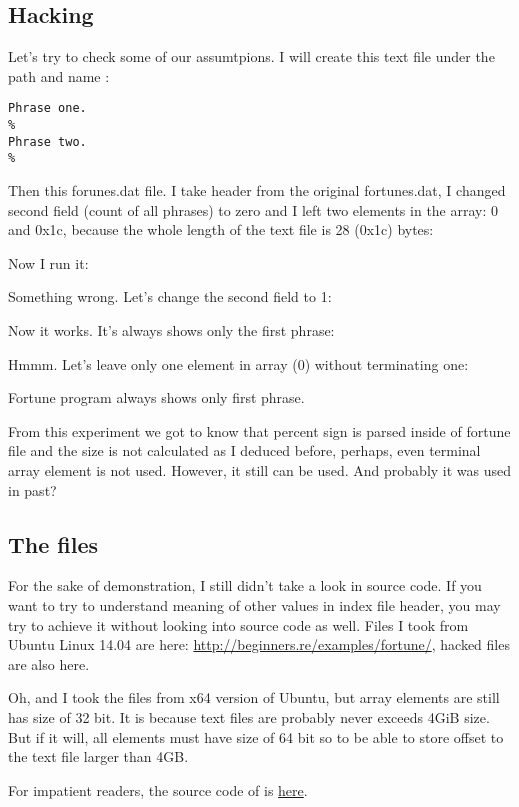 \subsection{Hacking}

Let's try to check some of our assumtpions.
I will create this text file under the path and name :

\begin{lstlisting}
Phrase one.
%
Phrase two.
%
\end{lstlisting}

Then this forunes.dat file. I take header from the original fortunes.dat, I changed second field (count of all phrases) to zero and I left two
elements in the array: 0 and 0x1c, because the whole length of the text  file is 28 (0x1c) bytes:



Now I run it:



Something wrong. Let's change the second field to 1:



Now it works. It's always shows only the first phrase:



Hmmm. Let's leave only one element in array (0) without terminating one:



Fortune program always shows only first phrase.

From this experiment we got to know that percent sign is parsed inside of fortune file and the size is not calculated as
I deduced before, perhaps, even terminal array element is not used.
However, it still can be used. And probably it was used in past?


\subsection{The files}

For the sake of demonstration, I still didn't take a look in  source code.
If you want to try to understand meaning of other values in index file header, you may try to achieve it without looking into source code as well.
Files I took from Ubuntu Linux 14.04 are here: \url{http://beginners.re/examples/fortune/}, hacked files are also here.

Oh, and I took the files from x64 version of Ubuntu, but array elements are still has size of 32 bit.
It is because  text files are probably never exceeds 4\ac{GiB} size.
But if it will, all elements must have size of 64 bit so to be able to store offset to the text file larger than 4GB.

For impatient readers, the source code of  is \href{https://launchpad.net/ubuntu/+source/fortune-mod/1:1.99.1-3.1ubuntu4}{here}.

